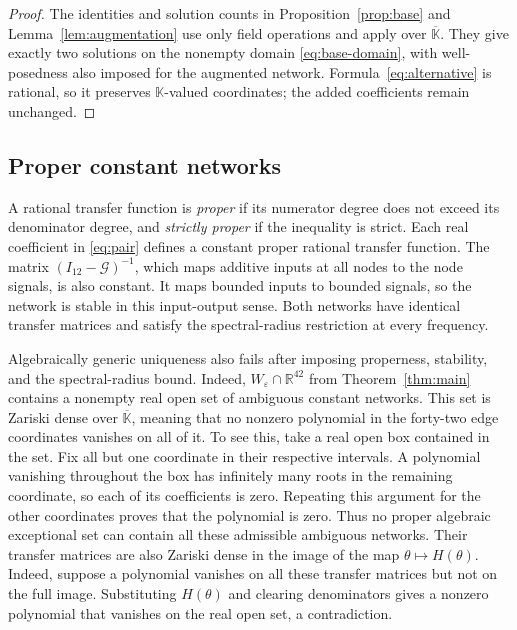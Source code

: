 \documentclass[letterpaper,10pt,conference]{ieeeconf}
\begin{document}
\begin{proof}
The identities and solution counts in Proposition~\ref{prop:base} and
Lemma~\ref{lem:augmentation} use only field operations and apply
over \(\overline{\mathbb K}\). They give exactly two solutions on
the nonempty domain \eqref{eq:base-domain}, with well-posedness also
imposed for the augmented network. Formula~\eqref{eq:alternative}
is rational, so it preserves \(\mathbb K\)-valued coordinates;
the added coefficients remain unchanged.
\end{proof}

\subsection{Proper constant networks}

A rational transfer function is \emph{proper} if its numerator
degree does not exceed its denominator degree, and
\emph{strictly proper} if the inequality is strict.
Each real coefficient in \eqref{eq:pair} defines a constant proper
rational transfer function.
The matrix \((I_{12}-\mathcal G)^{-1}\), which maps additive inputs
at all nodes to the node signals, is also constant. It maps bounded
inputs to bounded signals, so the network is stable in this
input-output sense. Both networks have identical transfer matrices
and satisfy the spectral-radius restriction at every frequency.

Algebraically generic uniqueness also fails after imposing properness,
stability, and the spectral-radius bound.
Indeed, \(W_\varepsilon\cap\mathbb R^{42}\) from
Theorem~\ref{thm:main} contains a nonempty real open set of ambiguous
constant networks. This set is Zariski dense over
\(\overline{\mathbb K}\), meaning that no nonzero polynomial in the
forty-two edge coordinates vanishes on all of it.
To see this, take a real open box contained in the set. Fix all but
one coordinate in their respective intervals. A polynomial vanishing
throughout the box has infinitely many roots in the remaining
coordinate, so each of its coefficients is zero. Repeating this
argument for the other coordinates proves that the polynomial is zero.
Thus no proper algebraic exceptional set can contain all these
admissible ambiguous networks.
Their transfer matrices are also Zariski dense in the image of
the map \(\theta\mapsto H(\theta)\).
Indeed, suppose a polynomial vanishes on all these transfer matrices but
not on the full image. Substituting \(H(\theta)\) and clearing
denominators gives a nonzero polynomial that vanishes on the real
open set, a contradiction.
\end{document}
